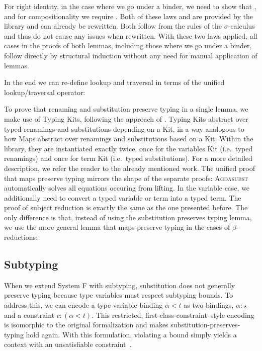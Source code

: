 \documentclass[screen,nonacm]{acmart}
\begin{document}
\noindent For right identity, in the case where we go under a binder, we need to show that
\AIdLift{}, and for compositionality we require \ADistLift{}. Both of these
laws  and  are provided by the library and can already be rewritten.
Both follow from the rules of the
$\sigma$-calculus and thus do not cause any issues when rewritten. With these
two laws applied, all cases in the proofs of both lemmas, including those where
we go under a binder, follow directly by structural induction without any need
for manual application of lemmas.

In the end we can re-define lookup and traversal in terms of the unified
lookup/traversal operator:

\begin{minipage}[t]{0.48\linewidth}
      \small
      \raggedright{}
      \SFLookupSH{}
\end{minipage}
\begin{minipage}[t]{0.48\linewidth}
      \small
      \raggedright{}
      \SFTraversalSH{}
\end{minipage}

\noindent To prove that renaming and substitution preserve typing in a single lemma, we
make use of Typing Kits, following the approach of \citet{saffrich:LIPIcs.ITP.2024.32}. Typing
Kits abstract over typed renamings and substitutions depending on a Kit, in a
way analogous to how Maps abstract over renamings and substitutions based on
a Kit. Within the library, they are instantiated exactly twice, once for the
variables Kit (i.e.\ typed renamings) and once for term Kit (i.e.\ typed substitutions). For a
more detailed description, we refer the reader to the already mentioned work.
The unified proof that maps preserve typing mirrors the shape of the separate
proofs: \SFSPT{}\textsc{Agdasubst} automatically solves all equations occuring
from lifting. In the variable case, we additionally need to convert a typed
variable or term into a typed term. The proof of subject reduction is exactly the
same as the one presented before. The only difference is that, instead of using
the substitution preserves typing lemma, we use the more general lemma that
maps preserve typing in the cases of $\beta$-reductions: \SFSR{}

\subsection*{Subtyping}
When we extend System F with subtyping\cite{CARDELLI19944}, substitution does
not generally preserve typing because type variables must respect subtyping
bounds. To address this, we can encode a type variable binding $\alpha < t$ as
two bindings, $\alpha : \star$ and a constraint $c : (\alpha < t)$. This
restricted, first-class-constraint–style encoding is isomorphic to the original
formalization and makes substitution-preserves-typing hold again. With this
formulation, violating a bound simply yields a context with an unsatisfiable
constraint~\cite{saffrich:LIPIcs.ITP.2024.32}.
\end{document}

